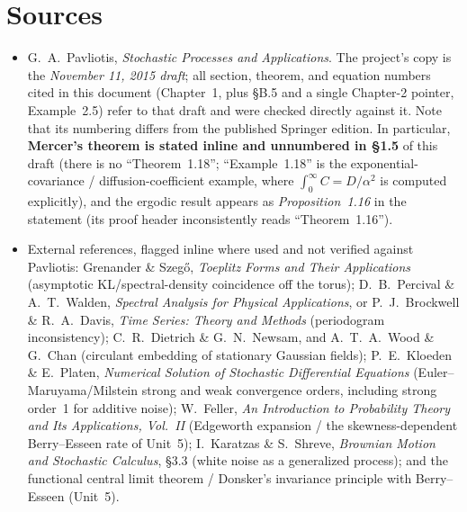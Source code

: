 \documentclass[11pt]{article}
\begin{document}
\section*{Sources}
\begin{itemize}[leftmargin=1.4cm]
  \item G.~A.~Pavliotis, \emph{Stochastic Processes and Applications}. The project's copy is the \emph{November 11, 2015 draft}; all section, theorem, and equation numbers cited in this document (Chapter~1, plus \S B.5 and a single Chapter-2 pointer, Example~2.5) refer to that draft and were checked directly against it. Note that its numbering differs from the published Springer edition. In particular, \textbf{Mercer's theorem is stated inline and unnumbered in \S1.5} of this draft (there is no ``Theorem~1.18''; ``Example~1.18'' is the exponential-covariance / diffusion-coefficient example, where $\int_0^\infty C = D/\alpha^2$ is computed explicitly), and the ergodic result appears as \emph{Proposition~1.16} in the statement (its proof header inconsistently reads ``Theorem~1.16'').
  \item External references, flagged inline where used and not verified against Pavliotis: Grenander \& Szeg\H{o}, \emph{Toeplitz Forms and Their Applications} (asymptotic KL/spectral-density coincidence off the torus); D.~B.~Percival \& A.~T.~Walden, \emph{Spectral Analysis for Physical Applications}, or P.~J.~Brockwell \& R.~A.~Davis, \emph{Time Series: Theory and Methods} (periodogram inconsistency); C.~R.~Dietrich \& G.~N.~Newsam, and A.~T.~A.~Wood \& G.~Chan (circulant embedding of stationary Gaussian fields); P.~E.~Kloeden \& E.~Platen, \emph{Numerical Solution of Stochastic Differential Equations} (Euler--Maruyama/Milstein strong and weak convergence orders, including strong order~1 for additive noise); W.~Feller, \emph{An Introduction to Probability Theory and Its Applications, Vol.~II} (Edgeworth expansion / the skewness-dependent Berry--Esseen rate of Unit~5); I.~Karatzas \& S.~Shreve, \emph{Brownian Motion and Stochastic Calculus}, \S3.3 (white noise as a generalized process); and the functional central limit theorem / Donsker's invariance principle with Berry--Esseen (Unit~5).
\end{itemize}
\end{document}
